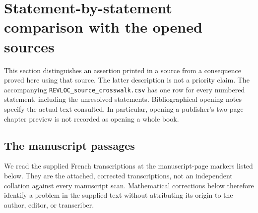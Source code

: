\section{Statement-by-statement comparison with the opened sources}

This section distinguishes an assertion printed in a source from a consequence
proved here using that source. The latter description is not a priority claim.
The accompanying \texttt{REVLOC\_source\_crosswalk.csv} has one row for every
numbered statement, including the unresolved statements. Bibliographical
opening notes specify the actual text consulted. In particular, opening a
publisher's two-page chapter preview is not recorded as opening a whole book.

\subsection{The manuscript passages}

We read the supplied French transcriptions at the manuscript-page markers
listed below. They are the attached, corrected transcriptions, not an
independent collation against every manuscript scan. Mathematical corrections
below therefore identify a problem in the supplied text without attributing
its origin to the author, editor, or transcriber.

